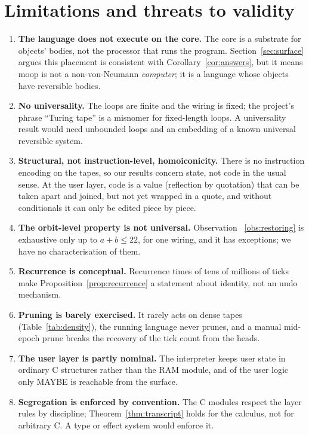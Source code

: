 \documentclass[11pt]{article}
\theoremstyle{definition}
\theoremstyle{remark}
\newcommand{\moop}{\textsf{moop}}
\begin{document}
\section{Limitations and threats to validity}
\label{sec:limits}

\begin{enumerate}[nosep]
\item \textbf{The language does not execute on the core.} The core is a
  substrate for objects' bodies, not the processor that runs the
  program. Section~\ref{sec:surface} argues this placement is consistent with
  Corollary~\ref{cor:answers}, but it means \moop{} is not a
  non-von-Neumann \emph{computer}; it is a language whose objects have
  reversible bodies.
\item \textbf{No universality.} The loops are finite and the wiring is
  fixed; the project's phrase ``Turing tape'' is a misnomer for
  fixed-length loops. A universality result would need unbounded loops
  and an embedding of a known universal reversible system.
\item \textbf{Structural, not instruction-level, homoiconicity.} There
  is no instruction encoding on the tapes, so our results concern state,
  not code in the usual sense. At the user layer, code is a value
  (reflection by quotation) that can be taken apart and joined, but not
  yet wrapped in a quote, and without conditionals it can only be edited
  piece by piece.
\item \textbf{The orbit-level property is not universal.} Observation~%
  \ref{obs:restoring} is exhaustive only up to $a+b\le22$, for one wiring,
  and it has exceptions; we have no characterisation of them.
\item \textbf{Recurrence is conceptual.} Recurrence times of tens of
  millions of ticks make Proposition~\ref{prop:recurrence} a statement
  about identity, not an undo mechanism.
\item \textbf{Pruning is barely exercised.} It rarely acts on dense
  tapes (Table~\ref{tab:density}), the running language never prunes,
  and a manual mid-epoch prune breaks the recovery of the tick count from
  the heads.
\item \textbf{The user layer is partly nominal.} The interpreter keeps
  user state in ordinary C structures rather than the RAM module, and
  of the user logic only MAYBE is reachable from the surface.
\item \textbf{Segregation is enforced by convention.} The C modules
  respect the layer rules by discipline; Theorem~\ref{thm:transcript}
  holds for the calculus, not for arbitrary C. A type or effect system
  would enforce it.
\end{enumerate}
\end{document}
